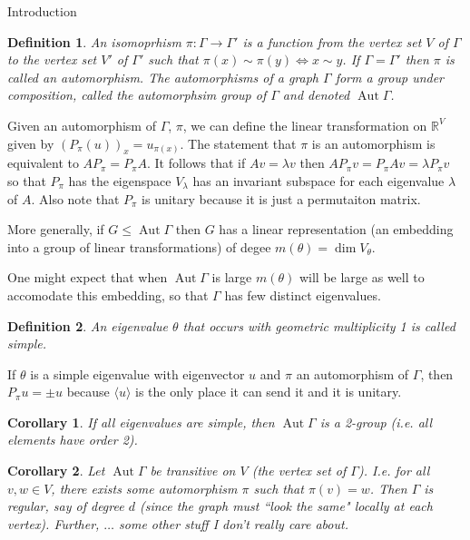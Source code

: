 \documentclass{article}
\DeclareMathOperator{\aut}{Aut}
\newcommand{\R}{\mathbb R}
\newtheorem{cor}{Corollary}
\newtheorem{defn}{Definition}
\begin{document}
\begin{section}{Introduction}
  \begin{defn}
    An \emph{isomoprhism} $\pi : \Gamma \to \Gamma'$ is a function from the vertex set $V$ of $\Gamma$ to the vertex set $V'$ of $\Gamma'$ such that $\pi(x) \sim \pi(y) \iff x \sim y$.
    If $\Gamma = \Gamma'$ then $\pi$ is called an \emph{automorphism}.
    The automorphisms of a graph $\Gamma$ form a group under composition, called the \emph{automorphsim group} of $\Gamma$ and denoted $\aut \Gamma$.
  \end{defn}

  Given an automorphism of $\Gamma$, $\pi$, we can define the linear transformation on $\R^V$ given by $(P_\pi(u))_x = u_{\pi(x)}$.
  The statement that $\pi$ is an automorphism is equivalent to $AP_\pi = P_\pi A$.
  It follows that if $Av = \lambda v$ then $AP_\pi v = P_\pi Av = \lambda P_\pi v$ so that $P_\pi$ has the eigenspace $V_\lambda$ has an invariant subspace for each eigenvalue $\lambda$ of $A$.
  Also note that $P_\pi$ is unitary because it is just a permutaiton matrix.

  More generally, if $G \leq \aut \Gamma$ then $G$ has a linear representation (an embedding into a group of linear transformations) of degee $m(\theta) = \dim V_\theta$.

  One might expect that when $\aut \Gamma$ is large $m(\theta)$ will be large as well to accomodate this embedding, so that $\Gamma$ has few distinct eigenvalues.

  \begin{defn}
    An eigenvalue $\theta$ that occurs with geometric multiplicity 1 is called \emph{simple}.
  \end{defn}

  If $\theta$ is a simple eigenvalue with eigenvector $u$ and $\pi$ an automorphism of $\Gamma$, then $P_\pi u = \pm u$ because $\langle u\rangle$ is the only place it can send it and it is unitary.

  \begin{cor}
    If all eigenvalues are simple, then $\aut \Gamma$ is a 2-group (i.e. all elements have order 2).
  \end{cor}

  \begin{cor}
    Let $\aut \Gamma$ be transitive on $V$ (the vertex set of $\Gamma$).
    I.e. for all $v,w \in V$, there exists some automorphism $\pi$ such that $\pi(v) = w$.
    Then $\Gamma$ is regular, say of degree $d$ (since the graph must ``look the same" locally at each vertex).
    Further, $\ldots$ some other stuff I don't really care about.
  \end{cor}


\end{section}
\end{document}
